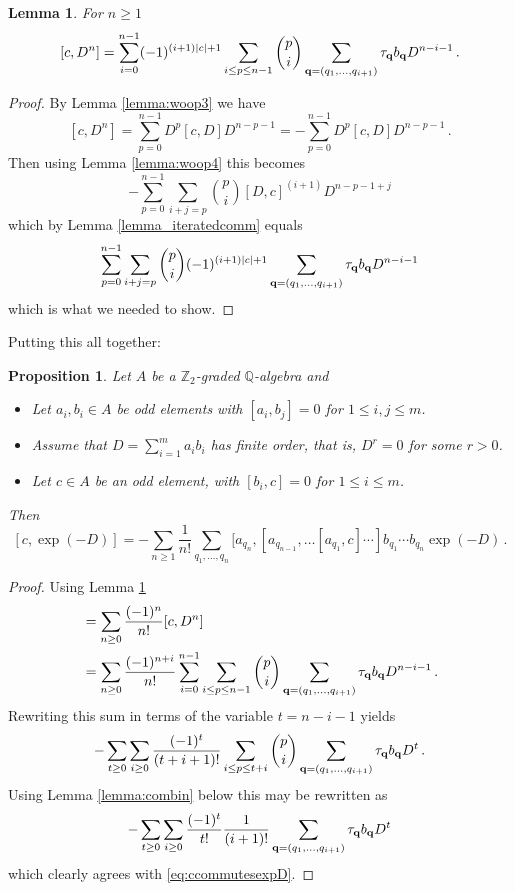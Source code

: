 \documentclass[english,letter paper,12pt,leqno]{article}
\newtheorem{proposition}[theorem]{Proposition}
\newtheorem{lemma}[theorem]{Lemma}
\theoremstyle{example}
\numberwithin{equation}{section}
\def\be{\begin{equation}}
\def\ee{\end{equation}}
\def\nZ{\mathds{Z}}
\def\nQ{\mathds{Q}}
\begin{document}
\begin{lemma}\label{lemma:commutator_wha} For $n \ge 1$
\[
[ c, D^n ] = \sum_{i=0}^{n-1} (-1)^{(i+1)|c| + 1} \sum_{i \le p \le n-1} \binom{p}{i} \sum_{\bold{q} = (q_1,\ldots,q_{i+1})} \tau_{\bold{q}} b_{\bold{q}} D^{n-i-1}\,.
\]
\end{lemma}
\begin{proof} 
By Lemma \ref{lemma:woop3} we have
\begin{equation}\label{eq:catfish}
[ c, D^n ] = \sum_{p=0}^{n-1} D^p [ c, D ] D^{n-p-1} = -\sum_{p=0}^{n-1} D^p [ c, D ] D^{n-p-1}\,.
\end{equation}
Then using Lemma \ref{lemma:woop4} this becomes
\be
-\sum_{p=0}^{n-1} \sum_{i+j=p} \binom{p}{i} [D, c]^{(i+1)} D^{n-p-1+j}
\ee
which by Lemma \ref{lemma_iteratedcomm} equals
\be
\sum_{p=0}^{n-1} \sum_{i+j=p} \binom{p}{i} (-1)^{(i+1)|c| + 1} \sum_{\bold{q} = (q_1,\ldots,q_{i+1})} \tau_{\bold{q}} b_{\bold{q}} D^{n-i-1}
\ee
which is what we needed to show.
\end{proof}

Putting this all together:

\begin{proposition}\label{prop:ccommutesexpD} Let $A$ be a $\nZ_2$-graded $\nQ$-algebra and
\begin{itemize}
\item Let $a_i, b_i \in A$ be odd elements with $[a_i,b_j] = 0$ for $1 \le i,j \le m$.
\item Assume that $D = \sum_{i=1}^m a_i b_i$ has finite order, that is, $D^r = 0$ for some $r > 0$.
\item Let $c \in A$ be an odd element, with $[b_i, c] = 0$ for $1 \le i \le m$.
\end{itemize}
Then
\be\label{eq:ccommutesexpD}
[c, \exp(-D)] = - \sum_{n \ge 1} \frac{1}{n!} \sum_{q_1,\ldots,q_n} [ a_{q_n}, [ a_{q_{n-1}}, \ldots [ a_{q_1}, c ] \cdots ] b_{q_1} \cdots b_{q_n} \exp(-D)\,.
\ee
\end{proposition}
\begin{proof}
Using Lemma \ref{lemma:commutator_wha}
\begin{align*}
[c, \exp(-D)] &= \sum_{n \ge 0} \frac{(-1)^n}{n!} [c, D^n]\\
&= \sum_{n \ge 0} \frac{(-1)^{n+i}}{n!} \sum_{i=0}^{n-1} \sum_{i \le p \le n -1} \binom{p}{i} \sum_{\bold{q} = (q_1,\ldots,q_{i+1})} \tau_{\bold{q}} b_{\bold{q}} D^{n-i-1}\,.
\end{align*}
Rewriting this sum in terms of the variable $t = n - i - 1$ yields
\[
- \sum_{t \ge 0} \sum_{i \ge 0} \frac{(-1)^{t}}{(t+i+1)!} \sum_{i \le p \le t+i}  \binom{p}{i} \sum_{\bold{q} = (q_1,\ldots,q_{i+1})} \tau_{\bold{q}} b_{\bold{q}} D^{t}\,.
\]
Using Lemma \ref{lemma:combin} below this may be rewritten as
\[
- \sum_{t \ge 0} \sum_{i \ge 0} \frac{(-1)^t}{t!} \frac{1}{(i+1)!} \sum_{\bold{q} = (q_1,\ldots,q_{i+1})} \tau_{\bold{q}} b_{\bold{q}} D^{t}
\]
which clearly agrees with \eqref{eq:ccommutesexpD}.
\end{proof}
\end{document}
